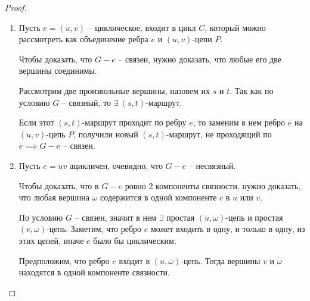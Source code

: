 \begin{proof}\leavevmode
    \begin{enumerate}
        \item Пусть $ e = (u,v) $ -- циклическое, входит в цикл $ C $, который можно рассмотреть как объединение ребра $ e $ и $ (u,v) $-цепи $ P $.
              \begin{figure}[H]
                  \centering
                  \label{fig:fig_18}
              \end{figure}

              Чтобы доказать, что $ G-e $ -- связен, нужно доказать, что любые его две вершины соединимы.

              Рассмотрим две произвольные вершины, назовем их $ s $ и $ t $. Так как по условию $ G $ -- связный, то $ \exists \ (s,t) $-маршрут.

              Если этот $ (s,t) $-маршрут проходит по ребру $ e $, то заменим в нем ребро $ e $ на $ (u,v) $-цепь $ P $, получили новый $ (s,t) $-маршрут, не проходящий по $ e \implies G-e $ -- связен.
              \begin{figure}[H]
                  \centering
                  \label{fig:fig_19}
              \end{figure}

        \item Пусть $ e = uv $ ацикличен, очевидно, что $ G-e $ -- несвязный.
              \begin{figure}[H]
                  \centering
                  \label{fig:fig_20}
              \end{figure}

              Чтобы доказать, что в $ G - e $ ровно 2 компоненты связности, нужно доказать, что любая вершина $ \omega $ содержится в одной компоненте $ c $ в $ u $ или $ v $.

              По условию $ G $ -- связен, значит в нем $ \exists $ простая $ (u,\omega) $-цепь и простая $ (v,\omega) $-цепь. Заметим, что ребро $ e $ может входить в одну, и только в одну, из этих цепей, иначе $ e $ было бы циклическим.
              \begin{figure}[H]
                  \centering
                  \label{fig:fig_21}
              \end{figure}

              Предположим, что ребро $ e $ входит в $ (u,\omega) $-цепь. Тогда вершины $ v $ и $ \omega $ находятся в одной компоненте связности.
    \end{enumerate}
\end{proof}

